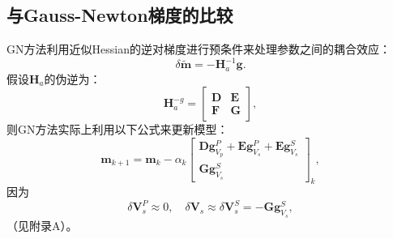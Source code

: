 \subsection{与Gauss-Newton梯度的比较}
GN方法利用近似Hessian的逆对梯度进行预条件来处理参数之间的耦合效应：
\begin{equation}
\delta\tilde{\mathbf{m}} = - \mathbf{H}^{-1}_a\mathbf{g}.
\label{eq:GN}
\end{equation}
假设$\mathbf{H}_a$的伪逆为：
\begin{equation}
        \mathbf{H}^{-g}_a=    
        \begin{bmatrix}
                \mathbf{D}&\mathbf{E} \\
                \mathbf{F}&\mathbf{G}
        \end{bmatrix},
        \label{eq:HessInv}
\end{equation}
则GN方法实际上利用以下公式来更新模型：
\begin{equation}
    \mathbf{{m}}_{k+1}
    =\mathbf{{m}}_{k}-\alpha_k 
    \begin{bmatrix}
        \mathbf{D}\mathbf{g}^P_{V_p} +
        \mathbf{E}\mathbf{g}^P_{V_s}+
        \mathbf{E}\mathbf{g}^S_{V_s}\\
        \mathbf{G}\mathbf{g}^S_{V_s}
    \end{bmatrix}_{k},
    \label{eq:PreGNFi}
\end{equation}
因为
\begin{equation}
        \delta \mathbf{V}^P_s\approx0, \quad \delta \mathbf{V}_s \approx \delta
        \mathbf{V}^S_s=-\mathbf{G}\mathbf{g}^S_{V_s},
        \label{eq:KeyPoint}
\end{equation}
（见附录A）。
